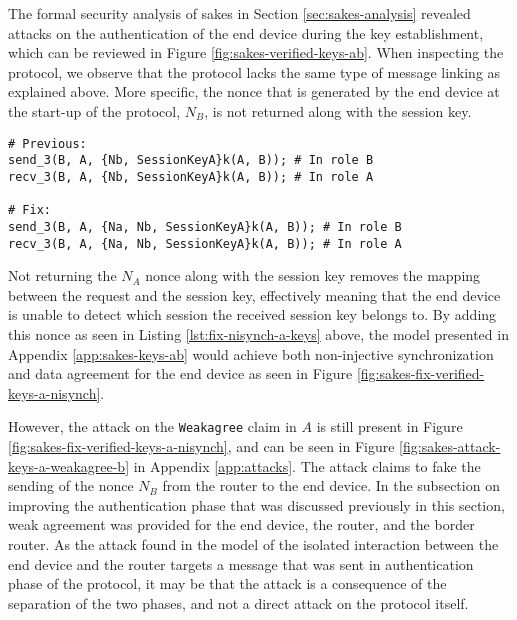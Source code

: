 The formal security analysis of \gls{sakes} in Section \ref{sec:sakes-analysis} revealed attacks on the authentication of the end device during the key establishment, which can be reviewed in Figure \ref{fig:sakes-verified-keys-ab}. When inspecting the protocol, we observe that the protocol lacks the same type of message linking as explained above. More specific, the nonce that is generated by the end device at the start-up of the protocol, $N_B$, is not returned along with the session key.


\begin{lstlisting}[caption={Fix to the SAKES protocol to provide non-injective synchronization and data agreement for the end device $A$ during the key distribution. Changes to the protocol are highlighted in blue.}, label={lst:fix-nisynch-a-keys}, style=code-improvements-sakes-1]
# Previous:
send_3(B, A, {Nb, SessionKeyA}k(A, B)); # In role B
recv_3(B, A, {Nb, SessionKeyA}k(A, B)); # In role A
	
# Fix:
send_3(B, A, {Na, Nb, SessionKeyA}k(A, B)); # In role B
recv_3(B, A, {Na, Nb, SessionKeyA}k(A, B)); # In role A
\end{lstlisting}

Not returning the $N_A$ nonce along with the session key removes the mapping between the request and the session key, effectively meaning that the end device is unable to detect which session the received session key belongs to. By adding this nonce as seen in Listing \ref{lst:fix-nisynch-a-keys} above, the model presented in Appendix \ref{app:sakes-keys-ab} would achieve both non-injective synchronization and data agreement for the end device as seen in Figure \ref{fig:sakes-fix-verified-keys-a-nisynch}. 

However, the attack on the \texttt{Weakagree} claim in $A$ is still present in Figure \ref{fig:sakes-fix-verified-keys-a-nisynch}, and can be seen in Figure \ref{fig:sakes-attack-keys-a-weakagree-b} in Appendix \ref{app:attacks}. The attack claims to fake the sending of the nonce $N_B$ from the router to the end device. In the subsection on improving the authentication phase that was discussed previously in this section, weak agreement was provided for the end device, the router, and the border router. As the attack found in the model of the isolated interaction between the end device and the router targets a message that was sent in authentication phase of the protocol, it may be that the attack is a consequence of the separation of the two phases, and not a direct attack on the protocol itself.


